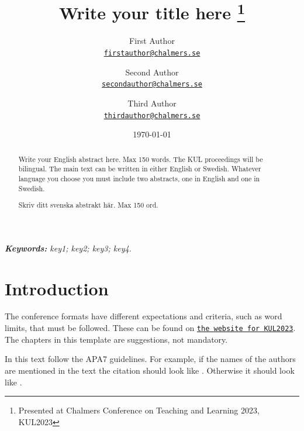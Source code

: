 \documentclass[11pt]{article}
\title{Write your title here
\thanks{Presented at Chalmers Conference on Teaching and Learning 2023, KUL2023}
}
\author{First Author\\%
    \href{mailto:firstauthor@chalmers.se}{\texttt{firstauthor@chalmers.se}} %
\and Second Author\\%
    \href{mailto:secondauthor@chalmers.se}{\texttt{secondauthor@chalmers.se}} %
\and Third Author\\%
    \href{mailto:thirdauthor@chalmers.se}{\texttt{thirdauthor@chalmers.se}}%
    }
\date{\today}
\begin{document}
\maketitle
{}
\begin{abstract}

Write your English abstract here. Max 150 words. The KUL proceedings will be bilingual. The main text can be written in either English or Swedish. Whatever language you choose you must include two abstracts, one in English and one in Swedish. %

\lipsum[1] %

\end{abstract}


\begin{abstract}

Skriv ditt svenska abstrakt här. Max 150 ord. %

\lipsum[1] %


\end{abstract}

\textit{\textbf{Keywords: }%
key1; key2; key3; key4.} \\ 


\section{Introduction}

The conference formats have different expectations and criteria, such as word limits, that must be followed. These can be found on \href{https://ui.ungpd.com/Issues/e0fb7d63-8d2c-4750-b0d7-eb92da240e1c?AccountId=8117a48b-bad0-418e-b612-2186302f6ab7&ContactId=21763c94-0f39-4710-b3df-4de5361ed673&IssueId=e0fb7d63-8d2c-4750-b0d7-eb92da240e1c&ir=e554dac0-c2a2-40f4-a314-28d3b3b50061}{\texttt{the website for KUL2023}}. The chapters in this template are suggestions, not mandatory.  %

In this text follow the APA7 guidelines. For example, if the names of the authors are mentioned in the text the citation should look like \citet{Hardaker2004}. Otherwise it should look like \citep{Chavas2015}. %
\end{document}
